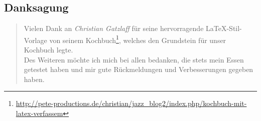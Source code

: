 
\subsection*{\centering Danksagung}
\begin{quote}
Vielen Dank an \emph{Christian Gatzlaff} f\"ur seine hervorragende \LaTeX-Stil-Vorlage von seinem Kochbuch\footnote{\url{http://pete-productions.de/christian/jazz_blog2/index.php/kochbuch-mit-latex-verfassem}}, welches den Grundstein f\"ur unser Kochbuch legte.\\

Des Weiteren m\"ochte ich mich bei allen bedanken, die stets mein Essen getestet haben und mir gute R\"uckmeldungen und Verbesserungen gegeben haben.
\end{quote}
